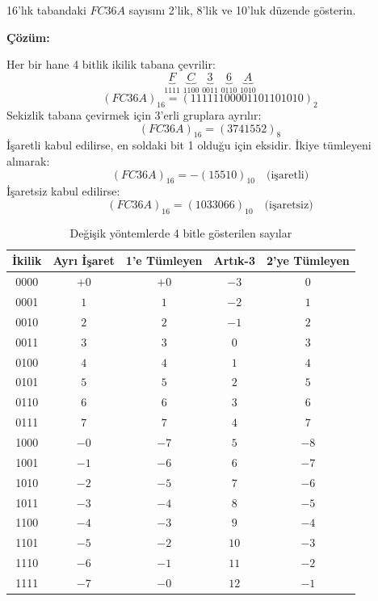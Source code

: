 \begin{ornek}[A.17]
16'lık tabandaki $FC36A$ sayısını 2'lik, 8'lik ve 10'luk düzende gösterin.

\textbf{Çözüm:}

Her bir hane 4 bitlik ikilik tabana çevrilir:
\[
\underbrace{F}_{1111}\;\underbrace{C}_{1100}\;\underbrace{3}_{0011}\;\underbrace{6}_{0110}\;\underbrace{A}_{1010}
\]
\[
(FC36A)_{16} = (11111100001101101010)_2
\]
Sekizlik tabana çevirmek için 3'erli gruplara ayrılır:
\[
(FC36A)_{16} = (3741552)_8
\]
İşaretli kabul edilirse, en soldaki bit 1 olduğu için eksidir. İkiye tümleyeni alınarak:
\[
(FC36A)_{16} = -(15510)_{10} \quad \text{(işaretli)}
\]
İşaretsiz kabul edilirse:
\[
(FC36A)_{16} = (1033066)_{10} \quad \text{(işaretsiz)}
\]
\end{ornek}

\begin{table}[H]
\centering
\caption{Değişik yöntemlerde 4 bitle gösterilen sayılar}
\label{tab:isaretli-yontemler}
\begin{tabular}{ccccc}
\toprule
\textbf{İkilik} & \textbf{Ayrı İşaret} & \textbf{1'e Tümleyen} & \textbf{Artık-3} & \textbf{2'ye Tümleyen} \\
\midrule
0000 & $+0$ & $+0$ & $-3$ & $0$  \\
0001 & $1$  & $1$  & $-2$ & $1$  \\
0010 & $2$  & $2$  & $-1$ & $2$  \\
0011 & $3$  & $3$  & $0$  & $3$  \\
0100 & $4$  & $4$  & $1$  & $4$  \\
0101 & $5$  & $5$  & $2$  & $5$  \\
0110 & $6$  & $6$  & $3$  & $6$  \\
0111 & $7$  & $7$  & $4$  & $7$  \\
1000 & $-0$ & $-7$ & $5$  & $-8$ \\
1001 & $-1$ & $-6$ & $6$  & $-7$ \\
1010 & $-2$ & $-5$ & $7$  & $-6$ \\
1011 & $-3$ & $-4$ & $8$  & $-5$ \\
1100 & $-4$ & $-3$ & $9$  & $-4$ \\
1101 & $-5$ & $-2$ & $10$ & $-3$ \\
1110 & $-6$ & $-1$ & $11$ & $-2$ \\
1111 & $-7$ & $-0$ & $12$ & $-1$ \\
\bottomrule
\end{tabular}
\end{table}

